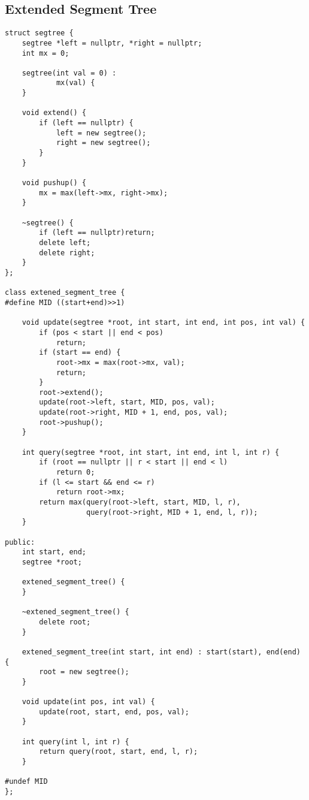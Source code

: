 \documentclass{article}
\begin{document}
\subsection{Extended Segment Tree}
\begin{verbatim}
struct segtree {  
    segtree *left = nullptr, *right = nullptr;  
    int mx = 0;  
  
    segtree(int val = 0) :  
            mx(val) {  
    }  
  
    void extend() {  
        if (left == nullptr) {  
            left = new segtree();  
            right = new segtree();  
        }  
    }  
  
    void pushup() {  
        mx = max(left->mx, right->mx);  
    }  
  
    ~segtree() {  
        if (left == nullptr)return;  
        delete left;  
        delete right;  
    }  
};  
  
class extened_segment_tree {  
#define MID ((start+end)>>1)  
  
    void update(segtree *root, int start, int end, int pos, int val) {  
        if (pos < start || end < pos)  
            return;  
        if (start == end) {  
            root->mx = max(root->mx, val);  
            return;  
        }  
        root->extend();  
        update(root->left, start, MID, pos, val);  
        update(root->right, MID + 1, end, pos, val);  
        root->pushup();  
    }  
  
    int query(segtree *root, int start, int end, int l, int r) {  
        if (root == nullptr || r < start || end < l)  
            return 0;  
        if (l <= start && end <= r)  
            return root->mx;  
        return max(query(root->left, start, MID, l, r),  
                   query(root->right, MID + 1, end, l, r));  
    }  
  
public:  
    int start, end;  
    segtree *root;  
  
    extened_segment_tree() {  
    }  
  
    ~extened_segment_tree() {  
        delete root;  
    }  
  
    extened_segment_tree(int start, int end) : start(start), end(end) {  
        root = new segtree();  
    }  
  
    void update(int pos, int val) {  
        update(root, start, end, pos, val);  
    }  
  
    int query(int l, int r) {  
        return query(root, start, end, l, r);  
    }  
  
#undef MID  
};
\end{verbatim}
\end{document}
